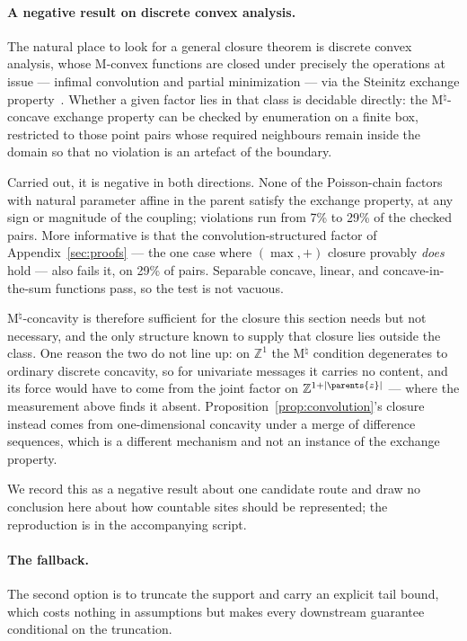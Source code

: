 \paragraph{A negative result on discrete convex analysis.} The natural place to look for a general closure theorem is discrete convex analysis, whose M-convex functions are closed under precisely the operations at issue --- infimal convolution and partial minimization --- via the Steinitz exchange property~\citep{Murota1996, Murota2003}. Whether a given factor lies in that class is decidable directly: the M$^{\natural}$-concave exchange property can be checked by enumeration on a finite box, restricted to those point pairs whose required neighbours remain inside the domain so that no violation is an artefact of the boundary.

Carried out, it is negative in both directions. None of the Poisson-chain factors with natural parameter affine in the parent satisfy the exchange property, at any sign or magnitude of the coupling; violations run from 7\% to 29\% of the checked pairs. More informative is that the convolution-structured factor of Appendix~\ref{sec:proofs} --- the one case where $(\max,+)$ closure provably \emph{does} hold --- also fails it, on 29\% of pairs. Separable concave, linear, and concave-in-the-sum functions pass, so the test is not vacuous.

M$^{\natural}$-concavity is therefore sufficient for the closure this section needs but not necessary, and the only structure known to supply that closure lies outside the class. One reason the two do not line up: on $\mathbb{Z}^1$ the M$^{\natural}$ condition degenerates to ordinary discrete concavity, so for univariate messages it carries no content, and its force would have to come from the joint factor on $\mathbb{Z}^{1 + \lvert \parents{z} \rvert}$ --- where the measurement above finds it absent. Proposition~\ref{prop:convolution}'s closure instead comes from one-dimensional concavity under a merge of difference sequences, which is a different mechanism and not an instance of the exchange property.

We record this as a negative result about one candidate route and draw no conclusion here about how countable sites should be represented; the reproduction is in the accompanying script.

\paragraph{The fallback.} The second option is to truncate the support and carry an explicit tail bound, which costs nothing in assumptions but makes every downstream guarantee conditional on the truncation.

